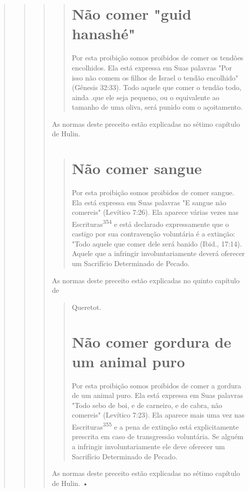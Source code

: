 \begin{quote}
\begin{quote}
\begin{quote}
\begin{quote}
\section{Não comer "guid hanashé"}

Por esta proibição somos proibidos de comer os tendões encolhi­dos. Ela
está expressa em Suas palavras "Por isso não comem os filhos de Israel o
tendão encolhido" (Gênesis 32:33). Todo aquele que comer o tendão todo,
ainda .que ele seja pequeno, ou o equivalente ao tamanho de uma oliva,
será punido com o açoitamento.
\end{quote}

As normas deste preceito estão explicadas no sétimo capítulo de Hulin.

\begin{quote}
\section{Não comer sangue}

Por esta proibição somos proibidos de comer sangue. Ela está ex­pressa
em Suas palavras "E sangue não comereis" (Levítico 7:26). Ela aparece
várias vezes nas Escrituras\textsuperscript{354} e está declarado
expressamente que o castigo por sua contravenção voluntária é a
extinção: "Todo aquele que comer dele será banido (Ibid., 17:14). Aquele
que a infringir involuntariamente deverá oferecer um Sacrifício
Determinado de Pecado.
\end{quote}

As normas deste preceito estão explicadas no quinto capítulo de

\begin{quote}
Queretot.

\section{Não comer gordura de um animal puro}

Por esta proibição somos proibidos de comer a gordura de um ani­mal
puro. Ela está expressa em Suas palavras "Todo sebo de boi, e de
carneiro, e de cabra, não comereis" (Levítico 7:23). Ela aparece mais
uma vez nas Escrituras\textsuperscript{355} e a pena de extinção está
explicitamente prescrita em caso de transgressão voluntária. Se alguém a
infringir involuntariamente ele deve ofe­recer um Sacrifício Determinado
de Pecado.
\end{quote}

As normas deste preceito estão explicadas no sétimo capítulo de Hulin. •


\end{quote}
\end{quote}
\end{quote}
